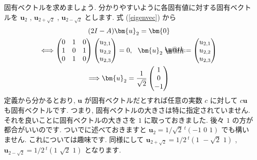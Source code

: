 \documentclass[openany, a4paper, oneside]{book}
\makeatletter
\newcommand*{\defeq}{\mathrel{\rlap{%
\raisebox{0.3ex}{$\m@th\cdot$}}%
\raisebox{-0.3ex}{$\m@th\cdot$}}%
=}
\theoremstyle{break}
\theoremstyle{breakdefn}
\makeatother
\begin{document}
固有ベクトルを求めましょう. 分かりやすいように各固有値に対する固有ベクトルを
 $\bm{u}_{2}$ ,  $\bm{u}_{2 + \sqrt{2}}$ ,  $\bm{u}_{2 - \sqrt{2}}$ とします.
式 (\ref{eigenvec}) から
    \begin{gather}
        (2 I - A )\bm{u}_{2} = \bm{0} \\
        \Longleftrightarrow
        \begin{pmatrix} 0 & 1 & 0 \\
                        1 & 0 & 1 \\
                        0 & 1 & 0
        \end{pmatrix}
        \begin{pmatrix} u_{2,1} \\ u_{2,2} \\ u_{2,3} \end{pmatrix}
        = 0 ,\,\,\,\, \bm{u}_{2} \defeq \begin{pmatrix} u_{2,1} \\ u_{2,2} \\ u_{2,3} \end{pmatrix} \\
        \Longrightarrow
        \bm{u}_{2}
        =
        \frac{1}{\sqrt{2}} \begin{pmatrix} 1 \\ 0 \\ -1 \end{pmatrix}
    \end{gather}
定義から分かるとおり,  $\bm{u}$ が固有ベクトルだとすれば任意の実数 $c$ に対して $c \bm{u}$ も固有ベクトルです.
つまり, 固有ベクトルの大きさは特に指定されていません. それを良いことに固有ベクトルの大きさを $1$ に取っておきました.
後々 $1$ の方が都合がいいのです. ついでに述べておきますと $\bm{u}_{2} = 1/\sqrt{2} \, ^{t}( -1 \,\, 0 \,\, 1)$ でも構いません.
これについては趣味です. 同様にして $\bm{u}_{2 + \sqrt{2}} = 1/2 \, ^{t}(1 \,\, -\sqrt{2} \,\, 1)$ ,
 $\bm{u}_{2 - \sqrt{2}} = 1/2 \, ^{t}(1 \,\, \sqrt{2} \,\, 1)$ となります.
\end{document}
